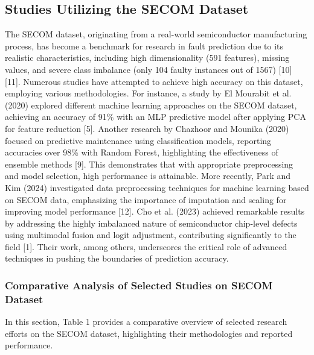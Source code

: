 \documentclass[12pt,oneside]{article}
\begin{document}
\subsection{Studies Utilizing the SECOM Dataset}
The SECOM dataset, originating from a real-world semiconductor manufacturing process, has become a benchmark for research in fault prediction due to its realistic characteristics, including high dimensionality (591 features), missing values, and severe class imbalance (only 104 faulty instances out of 1567) [10] [11]. Numerous studies have attempted to achieve high accuracy on this dataset, employing various methodologies.
For instance, a study by El Mourabit et al. (2020) explored different machine learning approaches on the SECOM dataset, achieving an accuracy of 91\% with an MLP predictive model after applying PCA for feature reduction [5]. Another research by Chazhoor and Mounika (2020) focused on predictive maintenance using classification models, reporting accuracies over 98\% with Random Forest, highlighting the effectiveness of ensemble methods [9]. This demonstrates that with appropriate preprocessing and model selection, high performance is attainable.
More recently, Park and Kim (2024) investigated data preprocessing techniques for machine learning based on SECOM data, emphasizing the importance of imputation and scaling for improving model performance [12]. Cho et al. (2023) achieved remarkable results by addressing the highly imbalanced nature of semiconductor chip-level defects using multimodal fusion and logit adjustment, contributing significantly to the field [1]. Their work, among others, underscores the critical role of advanced techniques in pushing the boundaries of prediction accuracy.
\subsubsection{ Comparative Analysis of Selected Studies on SECOM Dataset}In this section, Table 1 provides a comparative overview of selected research efforts on the SECOM dataset, highlighting their methodologies and reported performance.
\end{document}
